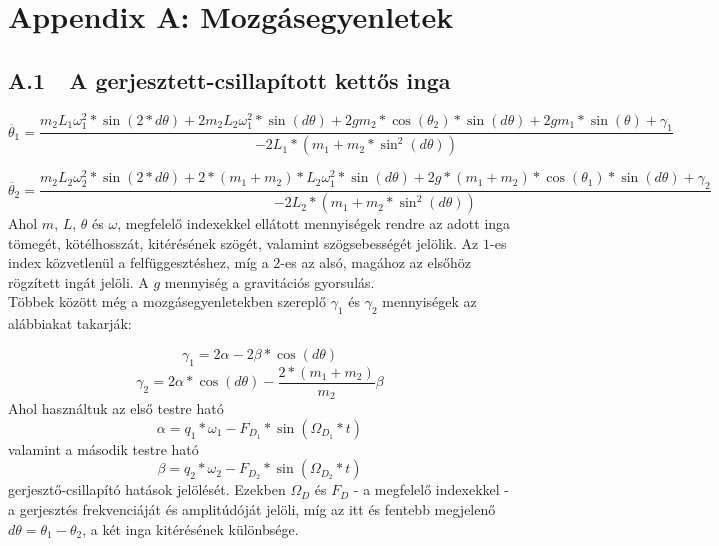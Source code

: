 \section*{Appendix A: Mozgásegyenletek}

\subsection*{A.1\ \ A gerjesztett-csillapított kettős inga}

\begin{equation}
    \ddot{\theta_{1}}
    =
    {
    \frac{m_{2} L_{1} \omega_{1}^{2} * \sin{\left( 2 * d \theta \right)}
    +
    2 m_{2} L_{2} \omega_{1}^{2} * \sin{\left( d \theta \right)}
    +
    2 g m_{2} * \cos{\left( \theta_{2} \right)} * \sin{\left( d \theta \right)}
    +
    2 g m_{1} * \sin{\left( \theta \right)}
    +
    \gamma_{1}
    }{
    -2 L_{1} * \left( m_1 + m_2 * \sin^{2}{\left( d \theta \right)} \right)
    }
    }
\end{equation}

\begin{equation}
    \ddot{\theta_{2}}
    =
    {
    \frac{m_{2} L_{2} \omega_{2}^{2} * \sin{\left( 2 * d \theta \right)}
    +
    2 * \left( m_{1} + m_{2} \right) * L_{2} \omega_{1}^{2} * \sin{\left( d \theta \right)}
    +
    2 g * \left( m_{1} + m_{2} \right) * \cos{\left( \theta_{1} \right)} * \sin{\left( d \theta \right)}
    +
    \gamma_{2}
    }{
    -2 L_{2} * \left( m_1 + m_2 * \sin^{2}{\left( d \theta \right)} \right)
    }
    }
\end{equation}
Ahol $m$, $L$, $\theta$ és $\omega$, megfelelő indexekkel ellátott mennyiségek rendre az adott inga tömegét, kötélhosszát, kitérésének szögét, valamint szögsebességét jelölik. Az $1$-es index közvetlenül a felfüggesztéshez, míg a $2$-es az alsó, magához az elsőhöz rögzített ingát jelöli. A $g$ mennyiség a gravitációs gyorsulás. \\
Többek között még a mozgásegyenletekben szereplő $\gamma_{1}$ és $\gamma_{2}$ mennyiségek az alábbiakat takarják:

\begin{equation}
    \gamma_{1}
    =
    2 \alpha - 2 \beta * \cos{\left( d \theta \right)}
\end{equation}
\begin{equation}
    \gamma_{2}
    =
    2 \alpha * \cos{\left( d \theta \right)}
    -
    \frac{2 * \left( m_{1} + m_{2} \right)}{m_{2}} \beta
\end{equation}
Ahol használtuk az első testre ható
\begin{equation}
    \alpha
    =
    q_{1} * \omega_{1}
    -
    F_{D_{1}} * \sin{\left( \Omega_{D_{1}} * t \right)}
\end{equation}
valamint a második testre ható
\begin{equation}
    \beta
    =
    q_{2} * \omega_{2}
    -
    F_{D_{2}} * \sin{\left( \Omega_{D_{2}} * t \right)}
\end{equation}
gerjesztő-csillapító hatások jelölését. Ezekben $\Omega_{D}$ és $F_{D}$ - a megfelelő indexekkel - a gerjesztés frekvenciáját és amplitúdóját jelöli, míg az itt és fentebb megjelenő $d \theta = \theta_{1} - \theta_{2}$, a két inga kitérésének különbsége.
